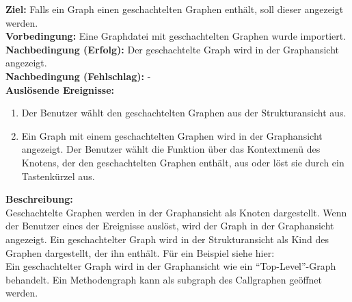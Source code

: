\label{fa:hierarchgraph}
\textbf{Ziel:} Falls ein Graph einen geschachtelten Graphen enthält, soll dieser angezeigt werden.\\
\textbf{Vorbedingung:} Eine Graphdatei mit geschachtelten Graphen wurde importiert.\\
\textbf{Nachbedingung (Erfolg):} Der geschachtelte Graph wird in der Graphansicht angezeigt.\\
\textbf{Nachbedingung (Fehlschlag):} -\\
\textbf{Auslösende Ereignisse:}
\begin{enumerate}[nolistsep, label=(\alph*)]
  \item Der Benutzer wählt den geschachtelten Graphen aus der Strukturansicht aus.
  \item Ein Graph mit einem geschachtelten Graphen wird in der Graphansicht angezeigt.
  Der Benutzer wählt die Funktion über das Kontextmenü des Knotens, der den geschachtelten Graphen enthält, aus oder löst sie durch ein Tastenkürzel aus.
\end{enumerate}
\textbf{Beschreibung:}\\
Geschachtelte Graphen werden in der Graphansicht als Knoten dargestellt.
Wenn der Benutzer eines der Ereignisse auslöst, wird der Graph in der Graphansicht angezeigt.
Ein geschachtelter Graph wird in der Strukturansicht als Kind des Graphen dargestellt, der ihn enthält. Für ein Beispiel siehe hier:\\ %
Ein geschachtelter Graph wird in der Graphansicht wie ein ``Top-Level''-Graph behandelt. %
Ein Methodengraph kann als \gls{subgraph} des Callgraphen geöffnet werden.


